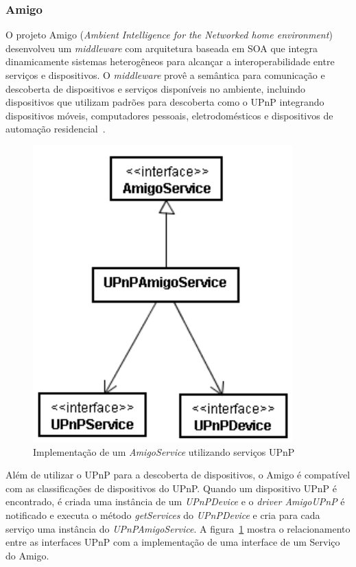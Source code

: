 \subsubsection{Amigo}
O projeto Amigo (\emph{Ambient Intelligence for the Networked home environment}) desenvolveu um \emph{middleware} com arquitetura baseada em SOA que integra dinamicamente sistemas heterogêneos para alcançar a interoperabilidade entre serviços e dispositivos. O \emph{middleware} provê a semântica para comunicação e descoberta de dispositivos e serviços disponíveis no ambiente, incluindo dispositivos que utilizam padrões para descoberta como o UPnP integrando dispositivos móveis, computadores pessoais, eletrodomésticos e dispositivos de automação residencial~\cite{amigoArch}.

\begin{figure}[ht]
\center
\includegraphics[scale=0.5]{imagens/amigo-interfaces}
\caption{Implementação de um \emph{AmigoService} utilizando serviços UPnP~\cite{amigoCore}}
\label{fig:amigoInterfaces}
\end{figure}

Além de utilizar o UPnP para a descoberta de dispositivos, o Amigo é compatível com as classificações de dispositivos do UPnP. Quando um dispositivo UPnP é encontrado, é criada uma instância de um \emph{UPnPDevice} e o \emph{driver AmigoUPnP} é notificado e executa o método \emph{getServices} do \emph{UPnPDevice} e cria para cada serviço uma instância do \emph{UPnPAmigoService}. A figura~\ref{fig:amigoInterfaces} mostra o relacionamento entre as interfaces UPnP com a implementação de uma interface de um Serviço do Amigo.

